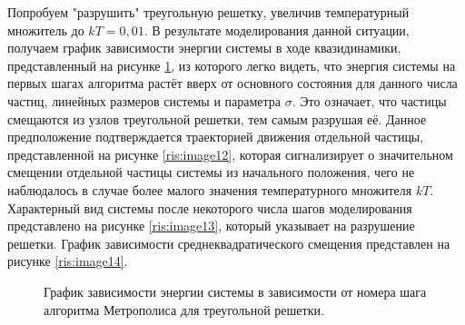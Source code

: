 \documentclass[14pt,a4paper,report]{ncc}
\begin{document}
{Попробуем "разрушить" треугольную решетку, увеличив температурный множитель до $kT=0,01$. В результате моделирования данной ситуации, получаем график зависимости энергии системы в ходе квазидинамики, представленный на рисунке \ref{ris:image11}, из которого легко видеть, что энергия системы на первых шагах алгоритма растёт вверх от основного состояния для данного числа частиц, линейных размеров системы и параметра $\sigma$. Это означает, что частицы смещаются из узлов треугольной решетки, тем самым разрушая её. Данное предположение подтверждается траекторией движения отдельной частицы, представленной на рисунке \ref{ris:image12}, которая сигнализирует о значительном смещении отдельной частицы системы из начального положения, чего не наблюдалось в случае более малого значения температурного множителя $kT$. Характерный вид системы после некоторого числа шагов моделирования представлено на рисунке \ref{ris:image13}, который указывает на разрушение решетки. График зависимости среднеквадратического смещения представлен на рисунке \ref{ris:image14}.
\
 \begin{figure}[h!]
\caption{График зависимости энергии системы в зависимости от номера шага алгоритма Метрополиса для треугольной решетки.}
\label{ris:image11}
\end{figure}
  \begin{figure}[h!]

\end{figure}}
\end{document}
